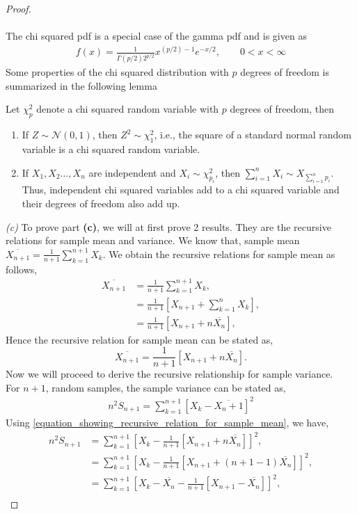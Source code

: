 \documentclass[a4paper,english,12pt]{article}
\begin{document}
\begin{proof}
\\
\\
The chi squared pdf is a special case of the gamma pdf and is given as 
\begin{align}
f(x)=\frac{1}{\Gamma(p/2)2^{p/2}}x^{(p/2)-1}e^{-x/2}, \qquad 0<x<\infty 
\end{align}
Some properties of the chi squared distribution with $p$ degrees of freedom is summarized in the following lemma 
\begin{lem}
Let $\chi _p^2$ denote a chi squared random variable with $p$ degrees of freedom, then 
\renewcommand{\labelenumi}{\alph{enumi})}
\begin{enumerate}
\item If $Z\sim \mathcal{N}(0,1)$, then $Z^2 \sim \chi_1^2$, i.e., the  square of a standard normal random variable is a chi squared random variable. 
\item If $X_1,X_2\dots , X_n$ are independent and $X_i\sim \chi _{p_i}^2$, then $\sum_{i=1}^nX_i\sim X_{\sum_{i=1}^np_i}$. Thus, independent chi squared variables add to a chi squared variable and their degrees of freedom also add up. 
\end{enumerate}
\end{lem}
\textit{(c)} To prove part \textbf{(c)}, we will at first prove 2 results. They are the recursive relations for sample mean and variance. We know that, sample mean $\overline{X_{n+1}}=\frac{1}{n+1} \sum\limits_{k=1}^{n+1} X_{k}$. We obtain the recursive relations for sample mean as follows,
\begin{align}
\overline{X_{n+1}}& =\frac{1}{n+1} \sum\limits_{k=1}^{n+1} X_{k}, \nonumber \\
& = \frac{1}{n+1} [X_{n+1} + \sum\limits_{k=1}^{n} X_{k}], \nonumber \\
& = \frac{1}{n+1} [X_{n+1} + n\overline{X_n}], \nonumber 
\end{align}
Hence the recursive relation for sample mean can be stated as,
\begin{equation} \label{equation_showing_recursive_relation_for_sample_mean}
\overline{X_{n+1}}= \frac{1}{n+1} [X_{n+1} + n\overline{X_n}].
\end{equation}
Now we will proceed to derive the recursive relationship for sample variance.\\
For $n+1$, random samples, the sample variance can be stated as,
\begin{align}
n^2S_{n+1}=\sum\limits_{k=1}^{n+1} [X_{k}-\overline{X_n+1}]^2
\end{align}
Using \eqref{equation_showing_recursive_relation_for_sample_mean}, we have,
\begin{align}
n^2S_{n+1}& =\sum\limits_{k=1}^{n+1} [X_{k}-\frac{1}{n+1} [X_{n+1} + n\overline{X_n}]]^2 , \nonumber \\
& =\sum\limits_{k=1}^{n+1} [X_{k}-\frac{1}{n+1} [X_{n+1} + (n+1-1)\overline{X_n}]]^2 , \nonumber \\
& =\sum\limits_{k=1}^{n+1} [X_{k}-\overline{X_n}-\frac{1}{n+1}[X_{n+1} - \overline{X_n}]]^2 , \nonumber \\
\end{align}
\end{proof}
\end{document}
